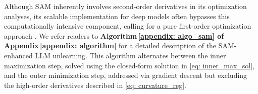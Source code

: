 





\begin{myremark}
Although SAM inherently involves second-order derivatives in its optimization analyses, its scalable implementation   for deep models often bypasses this computationally intensive component, calling for a pure first-order optimization approach \citep{foret2021sharpnessaware}. We refer readers to \textbf{Algorithm\,\ref{appendix: algo_sam} of Appendix\,\ref{appendix: algorithm}} for a detailed description of the SAM-enhanced LLM unlearning. This algorithm alternates between the inner maximization step, solved using the closed-form solution in \eqref{eq: inner_max_sol}, and the outer minimization step, addressed via gradient descent but excluding the high-order derivatives described in \eqref{eq: curvature_reg}.
\end{myremark}

